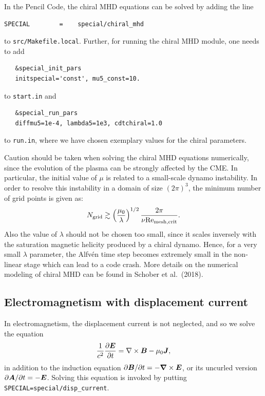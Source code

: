 \documentclass[\mydriver,12pt,twoside,notitlepage,a4paper]{article}
\newcommand{\code}[1]{\texttt{#1}}
\renewcommand{\vec}[1]{\mbox{\boldmath{$#1$}}}
\newcommand{\Av}            {\vec{A}}
\newcommand{\Bv}            {\vec{B}}
\newcommand{\Jv}            {\vec{J}}
\newcommand{\Ev}            {\vec{E}}
\newcommand{\nab}{\mbox{\boldmath $\nabla$} {}}
\begin{document}
In the Pencil Code, the chiral MHD equations can be solved by adding the line
\begin{verbatim}
SPECIAL        =    special/chiral_mhd 
\end{verbatim}
to \texttt{src/Makefile.local}.
Further, for running the chiral MHD module, one needs to add
\begin{verbatim}
   &special_init_pars
   initspecial='const', mu5_const=10.
\end{verbatim}
to \texttt{start.in} and
\begin{verbatim}
   &special_run_pars
   diffmu5=1e-4, lambda5=1e3, cdtchiral=1.0
\end{verbatim}
to \texttt{run.in}, where we have chosen exemplary values for the chiral
parameters.

Caution should be taken when solving the chiral MHD equations
numerically, since the evolution of the plasma can be strongly affected by 
the CME. 
In particular, the initial value of $\mu$ is related to 
a small-scale dynamo instability. 
In order to resolve this instability in a domain of size $(2\pi)^3$, 
the minimum number of grid points is given as:
\begin{equation}
  N_\mathrm{grid} \gtrsim \left(\frac{\mu_0}{\lambda}\right)^{1/2} \frac{2\pi}{\nu \mbox{Re}_{\rm mesh, crit}}.
\end{equation}
Also the value of $\lambda$ should not be chosen too small, since it scales 
inversely with the saturation magnetic helicity produced by a chiral dynamo. 
Hence, for a very small $\lambda$ parameter, the Alfv\'en time step becomes extremely small in the non-linear stage which can lead to a code crash.    
More details on the numerical modeling of chiral MHD can be found in
Schober et al.\ (2018).

\subsection{Electromagnetism with displacement current}

In electromagnetism, the displacement current is not neglected, and so we solve
the equation
\begin{equation}
\frac{1}{c^2} \frac{\partial\Ev}{\partial t}=\nabla\times\Bv-\mu_0\Jv,
\label{dEdt}
\end{equation}
in addition to the induction equation $\partial\Bv/\partial t=-\nab\times\Ev$,
or its uncurled version $\partial\Av/\partial t=-\Ev$.
Solving this equation is invoked by putting
\code{SPECIAL=special/disp_current}.
\end{document}
